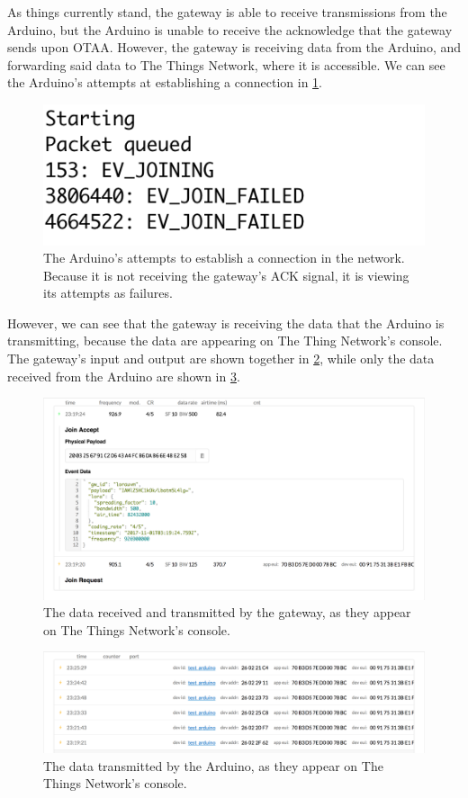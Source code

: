 As things currently stand, the gateway is able to receive transmissions from the Arduino, but the Arduino is unable to receive the acknowledge that the gateway sends upon OTAA.
However, the gateway is receiving data from the Arduino, and forwarding said data to The Things Network, where it is accessible.
We can see the Arduino's attempts at establishing a connection in \cref{fig:gateway_serial}.
\begin{figure}[ht]
  \centering
  \includegraphics{figure/gateway_serial}
  \caption{The Arduino's attempts to establish a connection in the network.  Because it is not receiving the gateway's ACK signal, it is viewing its attempts as failures.}
  \label{fig:gateway_serial}
\end{figure}

However, we can see that the gateway is receiving the data that the Arduino is transmitting, because the data are appearing on The Thing Network's console.
The gateway's input and output are shown together in \cref{fig:gateway_console}, while only the data received from the Arduino are shown in \cref{fig:arduino_console}.
\begin{figure}[ht]
  \centering
  \includegraphics[width=\textwidth]{figure/gateway_console}
  \caption{The data received and transmitted by the gateway, as they appear on The Things Network's console.}
  \label{fig:gateway_console}
\end{figure}
\begin{figure}[ht]
  \centering
  \includegraphics[width=\textwidth]{figure/arduino_console}
  \caption{The data transmitted by the Arduino, as they appear on The Things Network's console.}
  \label{fig:arduino_console}
\end{figure}

